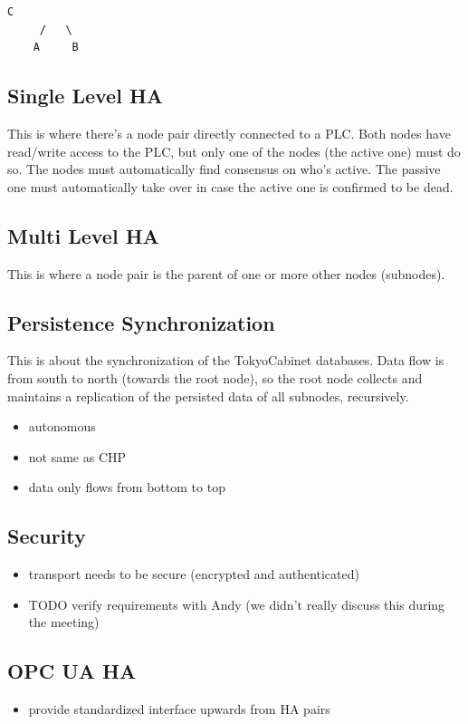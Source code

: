 \begin{lstlisting}[style=customsh]
       C
     /   \
    A     B
\end{lstlisting}



\subsection{Single Level HA}
This is where there's a node pair directly connected to a PLC. Both nodes have read/write access to the PLC, but only one of the nodes (the active one) must do so. The nodes must automatically find consensus on who's active. The passive one must automatically take over in case the active one is confirmed to be dead.



\subsection{Multi Level HA}
This is where a node pair is the parent of one or more other nodes (subnodes).

\subsection{Persistence Synchronization}
This is about the synchronization of the TokyoCabinet databases. Data flow is from south to north (towards the root node), so the root node collects and maintains a replication of the persisted data of all subnodes, recursively.

\begin{itemize}
	\item autonomous
	\item not same as CHP
	\item data only flows from bottom to top
\end{itemize}

\subsection{Security}
\begin{itemize}
	\item transport needs to be secure (encrypted and authenticated)
	\item TODO verify requirements with Andy (we didn't really discuss this during the meeting)
\end{itemize}

\subsection{OPC UA HA}
\begin{itemize}
	\item provide standardized interface upwards from HA pairs
\end{itemize}

